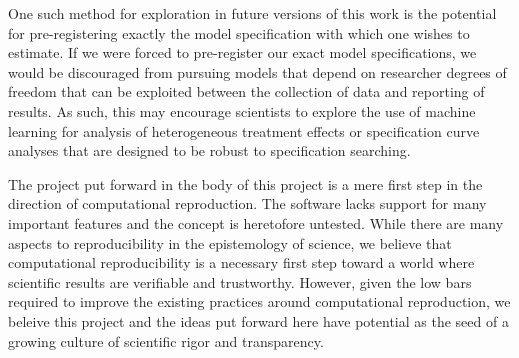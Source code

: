 One such method for exploration in future versions of this work is the potential for pre-registering exactly the model specification with which one wishes to estimate. If we were forced to pre-register our exact model specifications, we would be discouraged from pursuing models that depend on researcher degrees of freedom that can be exploited between the collection of data and reporting of results. As such, this may encourage scientists to explore the use of machine learning for analysis of heterogeneous treatment effects or specification curve analyses that are designed to be robust to specification searching. 

The project put forward in the body of this project is a mere first step in the direction of computational reproduction. The software lacks support for many important features and the concept is heretofore untested. While there are many aspects to reproducibility in the epistemology of science, we believe that computational reproducibility is a necessary first step toward a world where scientific results are verifiable and trustworthy. However, given the low bars required to improve the existing practices around computational reproduction, we beleive this project and the ideas put forward here have potential as the seed of a growing culture of scientific rigor and transparency. 
